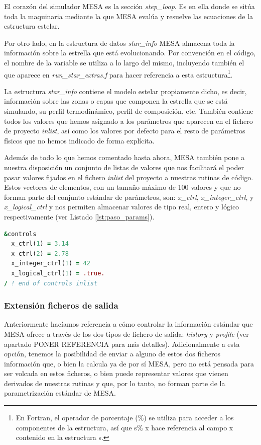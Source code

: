 El corazón del simulador MESA es la sección \textit{step\_loop}. Es en ella donde se sitúa toda la maquinaria mediante la que MESA evalúa y resuelve las ecuaciones de la estructura estelar.\par

Por otro lado, en la estructura de datos \textit{star\_info} MESA almacena toda la información sobre la estrella que está evolucionando. Por convención en el código, el nombre de la variable se utiliza a lo largo del mismo, incluyendo también el que aparece en  \textit{run\_star\_extras.f} para hacer referencia a esta estructura\footnote{En Fortran, el operador de porcentaje (\%) se utiliza para acceder a los componentes de la estructura, así que s\% x hace referencia al campo x contenido en la estructura s.}.\par

La estructura \textit{star\_info} contiene el modelo estelar propiamente dicho, es decir, información sobre las zonas o capas que componen la estrella que se está simulando, su perfil termodinámico, perfil de composición, etc. También contiene todos los valores que hemos asignado a los parámetros que aparecen en el fichero de proyecto \textit{inlist}, así como los valores por defecto para el resto de parámetros físicos que no hemos indicado de forma explícita.\par

Además de todo lo que hemos comentado hasta ahora, MESA también pone a nuestra disposición un conjunto de listas de valores que nos facilitará el poder pasar valores fijados en el fichero \textit{inlist} del proyecto a nuestras rutinas de código. Estos vectores de elementos, con un tamaño máximo de 100 valores y que no forman parte del conjunto estándar de parámetros, son: \textit{x\_ctrl}, \textit{x\_integer\_ctrl}, y \textit{x\_logical\_ctrl} y nos permiten almacenar valores de tipo real, entero y lógico respectivamente (ver Listado \ref{lst:paso_params}).\par

\begin{lstlisting}[language=Fortran, caption={Paso de parámetros no estándar a través del fichero de proyecto inlist}, label={lst:paso_params}]
&controls
  x_ctrl(1) = 3.14
  x_ctrl(2) = 2.78
  x_integer_ctrl(1) = 42
  x_logical_ctrl(1) = .true.
/ ! end of controls inlist
\end{lstlisting}

\subsubsection{Extensión ficheros de salida}
Anteriormente hacíamos referencia a cómo controlar la información estándar que MESA ofrece a través de los dos tipos de fichero de salida: \textit{history} y \textit{profile} (ver apartado PONER REFERENCIA para más detalles). Adicionalmente a esta opción, tenemos la posibilidad de enviar a alguno de estos dos ficheros información que, o bien la calcula ya de por sí MESA, pero no está pensada para ser volcada en estos ficheros, o bien puede representar valores que vienen derivados de nuestras rutinas y que, por lo tanto, no forman parte de la parametrización estándar de MESA.\par

